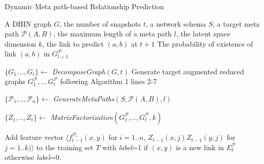 \begin{algorithm}[t]
\caption{Dynamic Meta path-based Relationship Prediction}\label{alg2}
\begin{algorithmic}[1]\scriptsize
\REQUIRE A DHIN graph $G$, the number of snapshots $t$, a network schema $S$, a target meta path $\mathcal{P}(A,B)$, the maximum length of a meta path $l$, the latent space dimension $k$, the link to predict $(a,b)$ at $t+1$
\ENSURE The probability of existence of link $(a,b)$ in $G^\mathcal{P}_{t+1}$

\STATE $\{G_1, .., G_t\} \leftarrow$ \textit{DecomposeGraph}$(G, t)$
\STATE  Generate target augmented reduced graphs $G^\mathcal{P}_1, .., G^\mathcal{P}_t$ following Algorithm 1 lines 2-7

\STATE $\{\mathcal{P}_1, .., \mathcal{P}_n\} \leftarrow$ \textit{GenerateMetaPaths}$(S, \mathcal{P}(A,B), l)$

%
%



\STATE $\{Z_1, .., Z_t\} \leftarrow$ \textit{MatrixFactorization}$(G^\mathcal{P}_1, .., G^\mathcal{P}_t, k)$



\STATE Add feature vector $\langle$$f^{\mathcal{P}_i}_{t-1}(x,y)$ for $i=1..n$, $Z_{t-1}(x,j)Z_{t-1}(y,j)$ for $j=1..k)\rangle$ to the training set $T$ with \textit{label}=1 if $(x,y)$ is a new link in $E^\mathcal{P}_{t}$ otherwise \textit{label}=0.


\end{algorithmic}
\end{algorithm}
